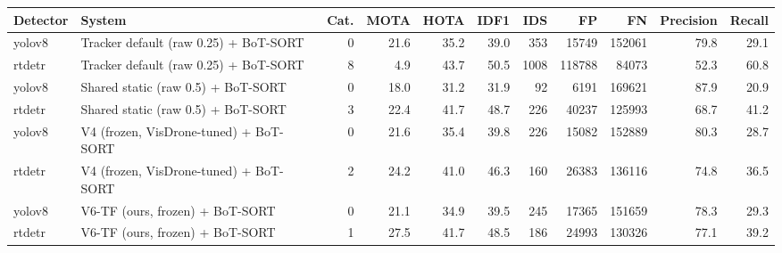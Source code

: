 \begin{tabular}{llrrrrrrrrr}
\toprule
Detector & System & Cat. & MOTA & HOTA & IDF1 & IDS & FP & FN & Precision & Recall \\
\midrule
yolov8 & Tracker default (raw 0.25) + BoT-SORT & 0 & 21.6 & 35.2 & 39.0 & 353 & 15749 & 152061 & 79.8 & 29.1 \\
rtdetr & Tracker default (raw 0.25) + BoT-SORT & 8 & 4.9 & 43.7 & 50.5 & 1008 & 118788 & 84073 & 52.3 & 60.8 \\
yolov8 & Shared static (raw 0.5) + BoT-SORT & 0 & 18.0 & 31.2 & 31.9 & 92 & 6191 & 169621 & 87.9 & 20.9 \\
rtdetr & Shared static (raw 0.5) + BoT-SORT & 3 & 22.4 & 41.7 & 48.7 & 226 & 40237 & 125993 & 68.7 & 41.2 \\
yolov8 & V4 (frozen, VisDrone-tuned) + BoT-SORT & 0 & 21.6 & 35.4 & 39.8 & 226 & 15082 & 152889 & 80.3 & 28.7 \\
rtdetr & V4 (frozen, VisDrone-tuned) + BoT-SORT & 2 & 24.2 & 41.0 & 46.3 & 160 & 26383 & 136116 & 74.8 & 36.5 \\
yolov8 & V6-TF (ours, frozen) + BoT-SORT & 0 & 21.1 & 34.9 & 39.5 & 245 & 17365 & 151659 & 78.3 & 29.3 \\
rtdetr & V6-TF (ours, frozen) + BoT-SORT & 1 & 27.5 & 41.7 & 48.5 & 186 & 24993 & 130326 & 77.1 & 39.2 \\
\bottomrule
\end{tabular}
